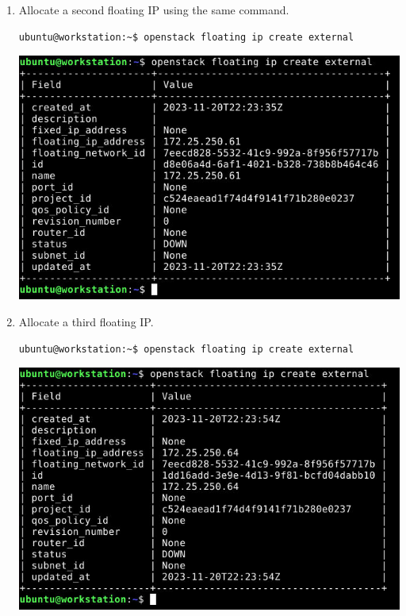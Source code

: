 \documentclass[letterpaper, 12pt]{article}
\begin{document}
\begin{enumerate}
    \item Allocate a second floating IP using the same command.
\begin{lstlisting}
ubuntu@workstation:~$ openstack floating ip create external
\end{lstlisting}

    \begin{center}
        \includegraphics[width=\linewidth]{images/part3/step13.png}
    \end{center}

    \item Allocate a third floating IP.
\begin{lstlisting}
ubuntu@workstation:~$ openstack floating ip create external
\end{lstlisting}

    \begin{center}
        \includegraphics[width=\linewidth]{images/part3/step14.png}
    \end{center}


\end{enumerate}
\end{document}
